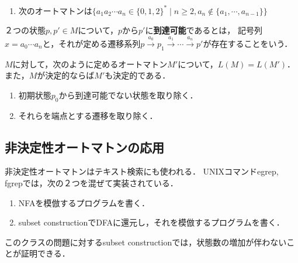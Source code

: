\documentclass[uplatex, dvipdfmx]{jsreport}
\begin{document}
\begin{example}
\begin{enumerate}
\begin{center}
        \end{center}
        \item 次のオートマトンは$\{a_1a_2\cdots a_n\in\{0,1,2\}^*\mid n\ge 2,a_n\notin\{a_1,\cdots,a_{n-1}\}\}$
    \end{enumerate}
\end{example}

\begin{definition}[accessible]\label{def-accessibility-of-states}
    ２つの状態$p,p'\in M$について，$p$から$p'$に\textbf{到達可能}であるとは，
    記号列$x=a_0\cdots a_n$と，それが定める遷移系列$p\xrightarrow{a_0}p_1\xrightarrow{a_1}\cdots\xrightarrow{a_n}p'$が存在することをいう．
\end{definition}

\begin{proposition}
    $M$に対して，次のように定めるオートマトン$M'$について，$L(M)=L(M')$．
    また，$M$が決定的ならば$M'$も決定的である．
    \begin{enumerate}
        \item 初期状態$p_0$から到達可能でない状態を取り除く．
        \item それらを端点とする遷移を取り除く．
    \end{enumerate}
\end{proposition}

\subsection{非決定性オートマトンの応用}

\begin{application}
    非決定性オートマトンはテキスト検索にも使われる．
    UNIXコマンドegrep, fgrepでは，次の２つを混ぜて実装されている．
    \begin{enumerate}
        \item NFAを模倣するプログラムを書く．
        \item subset constructionでDFAに還元し，それを模倣するプログラムを書く．
    \end{enumerate}
    このクラスの問題に対するsubset constructionでは，状態数の増加が伴わないことが証明できる．
\end{application}
\end{document}

